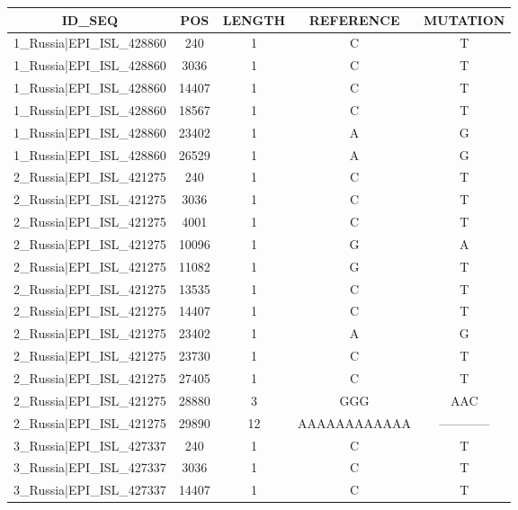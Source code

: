 \documentclass[a4paper,10pt]{article}
\begin{document}
\begin{longtable}{@{}ccccc@{}}
\toprule
\textbf{ID\_SEQ} & \textbf{POS} & \textbf{LENGTH} & \textbf{REFERENCE} & \textbf{MUTATION} \\* \midrule
\endfirsthead
%
\cline{1-5}
\endhead
%
1\_Russia|EPI\_ISL\_428860 & 240 & 1 & C & T \\* \midrule
1\_Russia|EPI\_ISL\_428860 & 3036 & 1 & C & T \\* \midrule
1\_Russia|EPI\_ISL\_428860 & 14407 & 1 & C & T \\* \midrule
1\_Russia|EPI\_ISL\_428860 & 18567 & 1 & C & T \\* \midrule
1\_Russia|EPI\_ISL\_428860 & 23402 & 1 & A & G \\* \midrule
1\_Russia|EPI\_ISL\_428860 & 26529 & 1 & A & G \\* \midrule
2\_Russia|EPI\_ISL\_421275 & 240 & 1 & C & T \\* \midrule
2\_Russia|EPI\_ISL\_421275 & 3036 & 1 & C & T \\* \midrule
2\_Russia|EPI\_ISL\_421275 & 4001 & 1 & C & T \\* \midrule
2\_Russia|EPI\_ISL\_421275 & 10096 & 1 & G & A \\* \midrule
2\_Russia|EPI\_ISL\_421275 & 11082 & 1 & G & T \\* \midrule
2\_Russia|EPI\_ISL\_421275 & 13535 & 1 & C & T \\* \midrule
2\_Russia|EPI\_ISL\_421275 & 14407 & 1 & C & T \\* \midrule
2\_Russia|EPI\_ISL\_421275 & 23402 & 1 & A & G \\* \midrule
2\_Russia|EPI\_ISL\_421275 & 23730 & 1 & C & T \\* \midrule
2\_Russia|EPI\_ISL\_421275 & 27405 & 1 & C & T \\* \midrule
2\_Russia|EPI\_ISL\_421275 & 28880 & 3 & GGG & AAC \\* \midrule
2\_Russia|EPI\_ISL\_421275 & 29890 & 12 & AAAAAAAAAAAA & ------------ \\* \midrule
3\_Russia|EPI\_ISL\_427337 & 240 & 1 & C & T \\* \midrule
3\_Russia|EPI\_ISL\_427337 & 3036 & 1 & C & T \\* \midrule
3\_Russia|EPI\_ISL\_427337 & 14407 & 1 & C & T \\* \midrule

\end{longtable}
\end{document}

